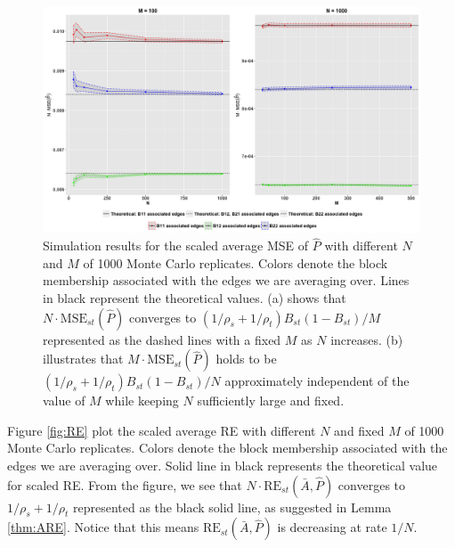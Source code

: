 \begin{figure}[!htb]
\centering
\includegraphics[width=16cm]{MSE.png}
\caption{Simulation results for the scaled average MSE of $\hat{P}$ with different $N$ and $M$ of 1000 Monte Carlo replicates. Colors denote the block membership associated with the edges we are averaging over. Lines in black represent the theoretical values.
 (a) shows that $N \cdot \mathrm{MSE}_{st}(\hat{P})$ converges to $(1/\rho_s + 1/\rho_t) B_{st}(1-B_{st}) / M$ represented as the dashed lines with a fixed $M$ as $N$ increases.
 (b) illustrates that $M \cdot \mathrm{MSE}_{st}(\hat{P})$ holds to be $(1/\rho_s + 1/\rho_t) B_{st}(1-B_{st}) / N$ approximately independent of the value of $M$ while keeping $N$ sufficiently large and fixed.}
\label{fig:MSE}
\end{figure}




Figure \ref{fig:RE} plot the scaled average RE with different $N$ and fixed $M$ of 1000 Monte Carlo replicates. Colors denote the block membership associated with the edges we are averaging over. Solid line in black represents the theoretical value for scaled RE. From the figure, we see that $N \cdot \mathrm{RE}_{st}(\bar{A}, \hat{P})$ converges to $1/\rho_s + 1/\rho_t$ represented as the black solid line, as suggested in Lemma \ref{thm:ARE}. Notice that this means $\mathrm{RE}_{st}(\bar{A}, \hat{P})$ is decreasing at rate $1/N$.



